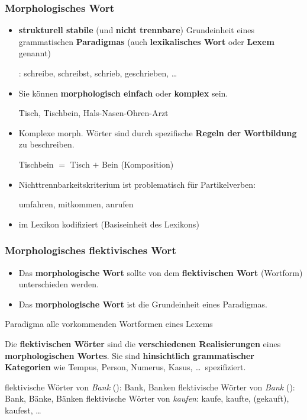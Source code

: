 \begin{frame}
\frametitle{Morphologisches Wort}

\begin{itemize}
	\item \textbf{strukturell stabile} (und \textbf{nicht trennbare}) Grundeinheit eines grammatischen \textbf{Paradigmas} (auch \textbf{lexikalisches Wort} oder \textbf{Lexem} genannt)

	\ea {}: schreibe, schreibst, schrieb, geschrieben, \ldots 
	\z 

\pause 
	
	\item Sie können \textbf{morphologisch einfach} oder \textbf{komplex} sein.
	
	\ea Tisch, Tischbein, Hals-Nasen-Ohren-Arzt
	\z 

\pause 
	
	\item Komplexe morph. Wörter sind durch spezifische \textbf{Regeln der Wortbildung} zu beschreiben.
	
	\ea Tischbein $=$ Tisch $+$ Bein (Komposition)
	\z 

\pause 

	\item Nichttrennbarkeitskriterium ist problematisch für Partikelverben:
	
	\ea umfahren, mitkommen, anrufen
	\z 
		
	\item im Lexikon kodifiziert (Basiseinheit des Lexikons)
\end{itemize}

\end{frame}


\begin{frame}
\frametitle{Morphologisches \vs flektivisches Wort}

\begin{itemize}
	\item Das \textbf{morphologische Wort} sollte von dem \textbf{flektivischen Wort} (Wortform) unterschieden werden.
	
	\item Das \textbf{morphologische Wort} ist die Grundeinheit eines Paradigmas.
\end{itemize}

	\begin{block}{Paradigma}
		alle vorkommenden Wortformen eines Lexems
	\end{block}
	
	Die \textbf{flektivischen Wörter} sind die \textbf{verschiedenen Realisierungen} eines \textbf{morphologischen Wortes}. Sie sind \textbf{hinsichtlich grammatischer Kategorien} wie
	Tempus, Person, Numerus, Kasus, \dots\ spezifiziert.
	
	\ea flektivische Wörter von \emph{Bank} (): Bank, Banken
	\ex flektivische Wörter von \emph{Bank} (): Bank, Bänke, Bänken
	\ex flektivische Wörter von \emph{kaufen}: kaufe, kaufte, (gekauft), kaufest, \dots   
	\z

\end{frame}


